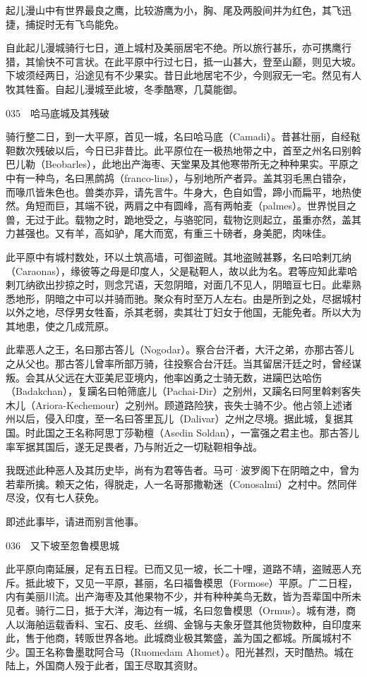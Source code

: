 \documentclass[12pt,UTF8]{ctexbook}
\begin{document}
起儿漫山中有世界最良之鹰，比较游鹰为小，胸、尾及两股间并为红色，其飞迅捷，捕捉时无有飞鸟能免。

自此起儿漫城骑行七日，道上城村及美丽居宅不绝。所以旅行甚乐，亦可携鹰行猎，其愉快不可言状。在此平原中行过七日，抵一山甚大，登至山巅，则见大坡。下坡须经两日，沿途见有不少果实。昔日此地居宅不少，今则寂无一宅。然见有人牧其牲畜。自起儿漫城至此坡，冬季酷寒，几莫能御。





035　哈马底城及其残破

骑行整二日，到一大平原，首见一城，名曰哈马底（Camadi）。昔甚壮丽，自经鞑靼数次残破以后，今日已非昔比。此平原位在一极热地带之中，首至之州名曰别斡巴儿勒（Beobarles），此地出产海枣、天堂果及其他寒带所无之种种果实。平原之中有一种鸟，名曰黑鹧鸪（franco-lins），与别地所产者异。盖其羽毛黑白错杂，而喙爪皆朱色也。兽类亦异，请先言牛。牛身大，色自如雪，蹄小而扁平，地热使然。角短而巨，其端不锐，两肩之中有圆峰，高有两帕麦（palmes）。世界悦目之兽，无过于此。载物之时，跪地受之，与骆驼同，载物讫则起立，虽重亦然，盖其力甚强也。又有羊，高如驴，尾大而宽，有重三十磅者，身美肥，肉味佳。

此平原中有城村数处，环以土筑高墙，可御盗贼。其地盗贼甚夥，名曰哈剌兀纳（Caraonas），缘彼等之母是印度人，父是鞑靼人，故以此为名。君等应知此辈哈剌兀纳欲出抄掠之时，则念咒语，天忽阴暗，对面几不见人，阴暗亘七日。此辈熟悉地形，阴暗之中可以并骑而驰。聚众有时至万人左右。由是所到之处，尽据城村以外之地，尽俘男女牲畜，杀其老弱，卖其壮丁妇女于他国，无能免者。所以大为其地患，使之几成荒原。

此辈恶人之王，名曰那古答儿（Nogodar）。察合台汗者，大汗之弟，亦那古答儿之从父也。那古答儿曾率所部万骑，往投察合台汗廷。当其留居汗廷之时，曾经谋叛。会其从父远在大亚美尼亚境内，他率凶勇之士骑无数，进躏巴达哈伤（Badakchan），复躏名曰帕筛底儿（Pachai-Dir）之别州，又躏名曰阿里斡剌客失木儿（Ariora-Kechemour）之别州。顾道路险狭，丧失士骑不少。他占领上述诸州以后，侵入印度，至一名曰答里瓦儿（Dalivar）之州之尽境。据此城，复据其国。时此国之王名称阿思丁莎勒檀（Asedin Soldan），一富强之君主也。那古答儿率军据其国后，遂无足畏者，乃与附近之一切鞑靼相争战。

我既述此种恶人及其历史毕，尚有为君等告者。马可·波罗阁下在阴暗之中，曾为若辈所擒。赖天之佑，得脱走，人一名哥那撒勒迷（Conosalmi）之村中。然同伴尽没，仅有七人获免。

即述此事毕，请进而别言他事。

036　又下坡至忽鲁模思城

此平原向南延展，足有五日程。已而又见一坡，长二十哩，道路不靖，盗贼恶人充斥。抵此坡下，又见一平原，甚丽，名曰福鲁模思（Formose）平原。广二日程，内有美丽川流。出产海枣及其他果物不少，并有种种美鸟无数，皆为吾辈国中所未见者。骑行二日，抵于大洋，海边有一城，名曰忽鲁模思（Ormus）。城有港，商人以海舶运载香料、宝石、皮毛、丝绸、金锦与夫象牙暨其他货物数种，自印度来此，售于他商，转贩世界各地。此城商业极其繁盛，盖为国之都城。所属城村不少。国王名称鲁墨耽阿合马（Ruomedam Ahomet）。阳光甚烈，天时酷热。城在陆上，外国商人殁于此者，国王尽取其资财。
\end{document}
